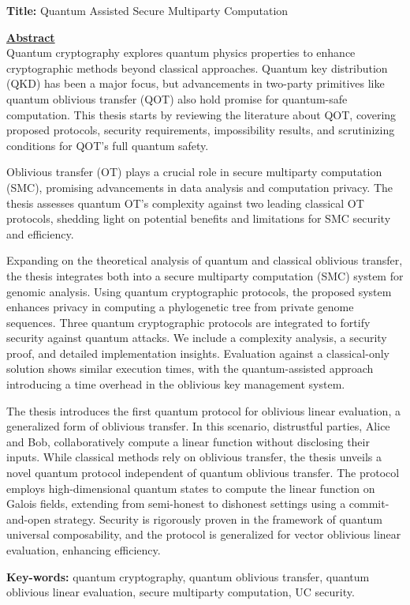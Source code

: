 \documentclass[11pt]{report}
\begin{document}
\noindent \textbf{Title:} Quantum Assisted Secure Multiparty Computation

\vspace{2\baselineskip}

\underline{\textbf{Abstract}}\\
\noindent Quantum cryptography explores quantum physics properties to enhance cryptographic methods beyond classical approaches. Quantum key distribution (QKD) has been a major focus, but advancements in two-party primitives like quantum oblivious transfer (QOT) also hold promise for quantum-safe computation. This thesis starts by reviewing the literature about QOT, covering proposed protocols, security requirements, impossibility results, and scrutinizing conditions for QOT's full quantum safety.

Oblivious transfer (OT) plays a crucial role in secure multiparty computation (SMC), promising advancements in data analysis and computation privacy. The thesis assesses quantum OT's complexity against two leading classical OT protocols, shedding light on potential benefits and limitations for SMC security and efficiency.

Expanding on the theoretical analysis of quantum and classical oblivious transfer, the thesis integrates both into a secure multiparty computation (SMC) system for genomic analysis. Using quantum cryptographic protocols, the proposed system enhances privacy in computing a phylogenetic tree from private genome sequences. Three quantum cryptographic protocols are integrated to fortify security against quantum attacks. We include a complexity analysis, a security proof, and detailed implementation insights. Evaluation against a classical-only solution shows similar execution times, with the quantum-assisted approach introducing a time overhead in the oblivious key management system.

The thesis introduces the first quantum protocol for oblivious linear evaluation, a generalized form of oblivious transfer. In this scenario, distrustful parties, Alice and Bob, collaboratively compute a linear function without disclosing their inputs. While classical methods rely on oblivious transfer, the thesis unveils a novel quantum protocol independent of quantum oblivious transfer. The protocol employs high-dimensional quantum states to compute the linear function on Galois fields, extending from semi-honest to dishonest settings using a commit-and-open strategy. Security is rigorously proven in the framework of quantum universal composability, and the protocol is generalized for vector oblivious linear evaluation, enhancing efficiency.

\vfill

\begin{flushleft}
\textbf{Key-words:} quantum cryptography, quantum oblivious transfer, quantum oblivious
linear evaluation, secure multiparty computation, UC security.
\end{flushleft}
\end{document}
